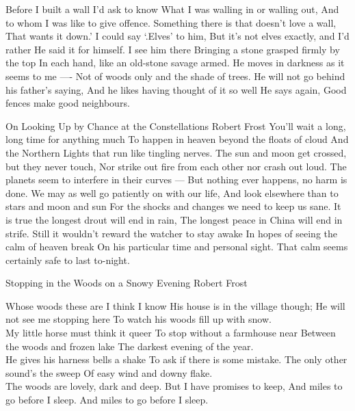\begin{poem}
     Before I built a wall I'd ask to know 			 
     What I was walling in or walling out, 			 
     And to whom I was like to give offence. 			 
     Something there is that doesn't love a wall, 		 
     That wants it down.' I could say `.Elves' to him, 		 
     But it's not elves exactly, and I'd rather 		 
     He said it for himself. I see him there 			 
     Bringing a stone grasped firmly by the top 		 
     In each hand, like an old-stone savage armed. 		 
     He moves in darkness as it seems to me ----		 
     Not of woods only and the shade of trees. 			 
     He will not go behind his father's saying, 		 
     And he likes having thought of it so well 			 
     He says again, Good fences make good neighbours.            
\end{poem}



\begin{poem}
{On Looking Up by Chance at the Constellations}
{Robert Frost}
     You'll wait a long, long time for anything much                 
     To happen in heaven beyond the floats of cloud 		     
     And the Northern Lights that run like tingling nerves. 	     
     The sun and moon get crossed, but they never touch, 	     
     Nor strike out fire from each other nor crash out loud. 	     
     The planets seem to interfere in their curves --- 		     
     But nothing ever happens, no harm is done. 		     
     We may as well go patiently on with our life, 		     
     And look elsewhere than to stars and moon and sun 		     
     For the shocks and changes we need to keep us sane. 	     
     It is true the longest drout will end in rain, 		     
     The longest peace in China will end in strife. 		     
     Still it wouldn't reward the watcher to stay awake 	     
     In hopes of seeing the calm of heaven break 		     
     On his particular time and personal sight. 		     
     That calm seems certainly safe to last to-night.                
\end{poem}

\begin{poem}
{Stopping in the Woods on a Snowy Evening}
{Robert Frost}

     Whose woods these are I think I know  
     His house is in the village though;   
     He will not see me stopping here 	   
     To watch his woods fill up with snow.\\

     My little horse must think it queer 
     To stop without a farmhouse near 	 
     Between the woods and frozen lake 	 
     The darkest evening of the year.    \\

     He gives his harness bells a shake   
     To ask if there is some mistake. 	  
     The only other sound's the sweep 	  
     Of easy wind and downy flake.       \\

     The woods are lovely, dark and deep. 
     But I have promises to keep, 	  
     And miles to go before I sleep. 	  
     And miles to go before I sleep.     
\end{poem}

